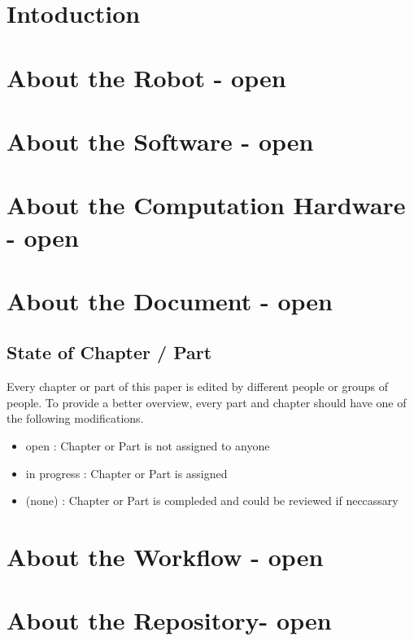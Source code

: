\chapter{Intoduction}
\chapter{About the Robot - open}
\chapter{About the Software - open}
\chapter{About the Computation Hardware - open}
\chapter{About the Document - open}
\section{State of Chapter / Part}
Every chapter or part of this paper is edited by different people or groups of
people. To provide a better overview, every part and chapter should have one of
the following modifications.
\begin{itemize}
  \item open : Chapter or Part is not assigned to anyone
  \item in progress : Chapter or Part is assigned
  \item (none) : Chapter or Part is compleded and could be reviewed if
  neccassary
\end{itemize}
\chapter{About the Workflow - open}
\chapter{About the Repository- open}
